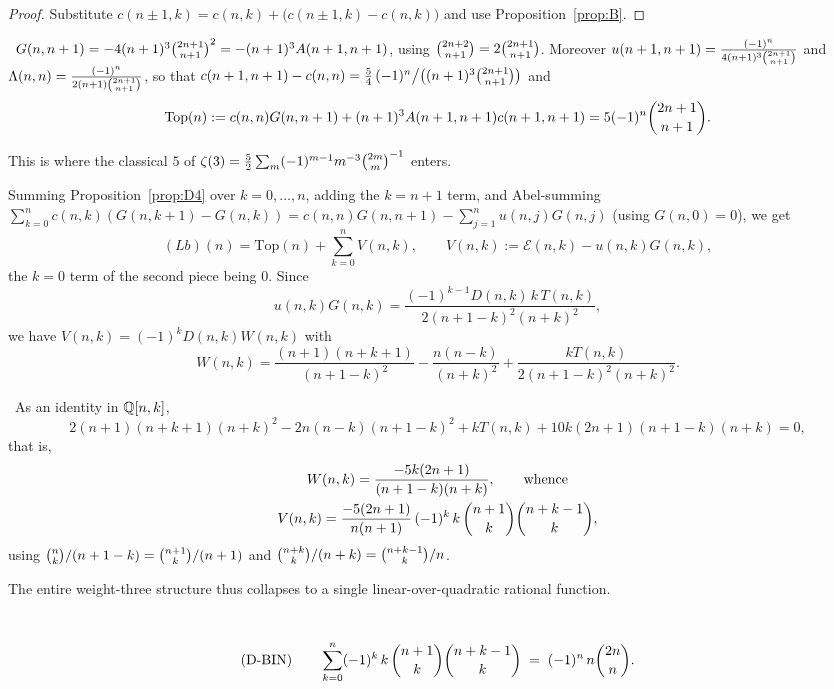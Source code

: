\begin{proof}
Substitute $c(n\pm1,k)=c(n,k)+\bigl(c(n\pm1,k)-c(n,k)\bigr)$ and use
Proposition~\ref{prop:B}.
\end{proof}

\begin{lemma}\label{lem:D5}
\Proved\ $G(n,n+1)=-4(n+1)^3\binom{2n+1}{n+1}^2=-(n+1)^3A(n+1,n+1)$, using
$\binom{2n+2}{n+1}=2\binom{2n+1}{n+1}$. Moreover
$u(n+1,n+1)=\frac{(-1)^n}{4(n+1)^3\binom{2n+1}{n+1}}$ and
$\Lambda(n,n)=\frac{(-1)^n}{2(n+1)\binom{2n+1}{n+1}}$, so that
$c(n+1,n+1)-c(n,n)=\tfrac54\,(-1)^n\bigl/\bigl((n+1)^3\binom{2n+1}{n+1}\bigr)$ and
\[
   \mathrm{Top}(n):=c(n,n)G(n,n+1)+(n+1)^3A(n+1,n+1)c(n+1,n+1)
   =5(-1)^n\binom{2n+1}{n+1}.
\]
\end{lemma}

This is where the classical $5$ of $\zeta(3)=\tfrac52\sum_m(-1)^{m-1}m^{-3}\binom{2m}{m}^{-1}$
enters.

Summing Proposition~\ref{prop:D4} over $k=0,\dots,n$, adding the $k=n+1$ term, and
Abel-summing $\sum_{k=0}^nc(n,k)(G(n,k+1)-G(n,k))=c(n,n)G(n,n+1)-\sum_{j=1}^nu(n,j)G(n,j)$
(using $G(n,0)=0$), we get
\begin{equation}\label{eq:Lb-assembly}
   (Lb)(n)=\mathrm{Top}(n)+\sum_{k=0}^{n}V(n,k),
   \qquad V(n,k):=\mathcal E(n,k)-u(n,k)G(n,k),
\end{equation}
the $k=0$ term of the second piece being $0$. Since
\[
  u(n,k)G(n,k)=\frac{(-1)^{k-1}D(n,k)\,k\,T(n,k)}{2(n+1-k)^2(n+k)^2},
\]
we have $V(n,k)=(-1)^kD(n,k)W(n,k)$ with
\[
   W(n,k)=\frac{(n+1)(n+k+1)}{(n+1-k)^2}-\frac{n(n-k)}{(n+k)^2}
          +\frac{kT(n,k)}{2(n+1-k)^2(n+k)^2}.
\]

\begin{lemma}[CERT-3]\label{lem:cert3}
\Proved\ As an identity in $\mathbb{Q}[n,k]$,
\[
   2(n+1)(n+k+1)(n+k)^2-2n(n-k)(n+1-k)^2+kT(n,k)+10k(2n+1)(n+1-k)(n+k)=0,
\]
that is,
\[
 \begin{gathered}
   W(n,k)=\frac{-5k(2n+1)}{(n+1-k)(n+k)},\qquad\text{whence}\\
   V(n,k)=\frac{-5(2n+1)}{n(n+1)}\,(-1)^k\,k\,\binom{n+1}{k}\binom{n+k-1}{k},
 \end{gathered}
\]
using $\binom{n}{k}/(n+1-k)=\binom{n+1}{k}/(n+1)$ and $\binom{n+k}{k}/(n+k)=\binom{n+k-1}{k}/n$.
\end{lemma}

The entire weight-three structure thus collapses to a single linear-over-quadratic
rational function.

\begin{lemma}\label{lem:D6}
\Proved\
\[
   \text{(D-BIN)}\qquad
   \sum_{k=0}^{n}(-1)^k\,k\,\binom{n+1}{k}\binom{n+k-1}{k}\;=\;(-1)^n\,n\binom{2n}{n} .
\]
\end{lemma}

